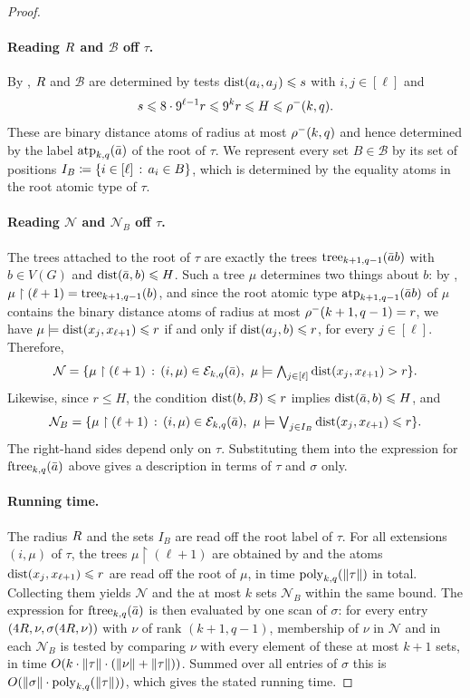 \begin{proof}
\paragraph{Reading $R$ and $\mathcal B$ off $\tau$.}
By , $R$ and $\mathcal B$ are determined by tests $\mathrm{dist}(a_i,a_j)\leqslant s$ with $i,j\in[\ell]$ and
\[
s\leqslant8\cdot9^{\ell-1}r\leqslant9^kr\leqslant H\leqslant\rho^-(k,q).
\]
These are binary distance atoms of radius at most $\rho^-(k,q)$ and hence determined by the label $\textnormal{atp}_{k,q}(\bar a)$ of the root of $\tau$.
We represent every set $B\in\mathcal B$ by its set of positions $I_B\coloneqq\{i\in[\ell] \,:\, a_i\in B \}$, which is determined by the equality atoms in the root atomic type of $\tau$.

\paragraph{Reading $\mathcal N$ and $\mathcal N_B$ off $\tau$.}
The trees attached to the root of $\tau$ are exactly 
the trees $\mathrm{tree}_{k+1,q-1}(\bar ab)$ with $b\in V(G)$ and $\mathrm{dist}(\bar a,b)\leqslant H$.
Such a tree $\mu$ determines two things about $b$: by , $\mu\restriction{(\ell+1)}=\mathrm{tree}_{k+1,q-1}(b)$, and since the root atomic type $\textnormal{atp}_{k+1,q-1}(\bar ab)$ of $\mu$ contains the binary distance atoms of radius at most $\rho^-(k+1,q-1)=r$, we have $\mu\models\mathrm{dist}(x_{j},x_{\ell+1})\leqslant r$ if and only if $\mathrm{dist}(a_{j},b)\leqslant r$, for every $j\in[\ell]$.
Therefore,
\[
\mathcal N
=\setof{\mu\restriction{(\ell+1)}}{(i,\mu)\in\mathcal E_{k,q}(\tup a),\ \mu\models\textstyle\bigwedge_{j\in[\ell]}\dist(x_{j},x_{\ell+1})>r}.
\]
Likewise, since $r\le H$, the condition $\mathrm{dist}(b,B)\leqslant r$ implies $\mathrm{dist}(\bar a,b)\leqslant H$, and
\[
\mathcal N_B
=\setof{\mu\restriction{(\ell+1)}}{(i,\mu)\in\mathcal E_{k,q}(\tup a),\ \mu\models\textstyle\bigvee_{j\in I_B}\dist(x_{j},x_{\ell+1})\le r}.
\]
The right-hand sides depend only on $\tau$.
Substituting them into the expression for $\textnormal{ftree}_{k,q}(\bar a)$ above gives a description in terms of $\tau$ and $\sigma$ only.


\paragraph{Running time.}
The radius $R$ and the sets $I_B$ are read off the root label of $\tau$.
For all extensions $(i,\mu)$ of $\tau$, the trees $\mu\restriction({\ell+1})$ are obtained by  and the atoms $\mathrm{dist}(x_{j},x_{\ell+1})\leqslant r$ are read off the root of $\mu$, in time $\mathrm{poly}_{k,q}(\lVert \tau\rVert)$ in total.
Collecting them yields $\mathcal N$ and the at most $k$ sets $\mathcal N_B$ within the same bound.
The expression for $\textnormal{ftree}_{k,q}(\bar a)$ is then evaluated by one scan of $\sigma$: for every entry $(4R,\nu,\sigma(4R,\nu))$ with $\nu$ of rank $(k+1,q-1)$, membership of $\nu$ in $\mathcal N$ and in each $\mathcal N_B$ is tested by comparing $\nu$ with every element of these at most $k+1$ sets, in time $O(k\cdot\lVert \tau\rVert\cdot(\lVert \nu\rVert+\lVert \tau\rVert))$.
Summed over all entries of $\sigma$ this is $O(\lVert \sigma\rVert\cdot\mathrm{poly}_{k,q}(\lVert \tau\rVert))$, which gives the stated running time.
\end{proof}




